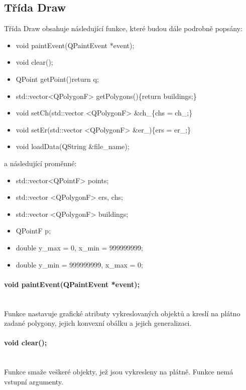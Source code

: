 \documentclass[11pt]{article}
\begin{document}
	 	
 	\subsection{Třída Draw}
 	Třída Draw obsahuje následující funkce, které budou dále podrobně popsány:
 	
 	\begin{itemize}
 		\item void paintEvent(QPaintEvent *event);
 		\item void clear();
 		\item QPoint getPoint(){return q;}
 		\item std::vector<QPolygonF> getPolygons()\{return buildings;\}
 		\item void setCh(std::vector <QPolygonF> \&ch\_\{chs = ch\_;\}
 		\item void setEr(std::vector <QPolygonF> \&er\_)\{ers = er\_;\}
 		\item void loadData(QString \&file\_name);
 	\end{itemize}
 	
 	a následující proměnné:
 	
 	\begin{itemize}
 		\item std::vector<QPointF> points;
 		\item std::vector <QPolygonF> ers, chs;
 		\item std::vector <QPolygonF> buildings;
 		\item QPointF p;
 		\item double y\_max = 0, x\_min = 999999999;
 		\item double y\_min = 999999999, x\_max = 0;
 	\end{itemize}
 	
 	\paragraph{void paintEvent(QPaintEvent *event);}\mbox{}\\
 	Funkce nastavuje grafické atributy vykreslovaných objektů a kreslí na plátno zadané polygony, jejich konvexní obálku a jejich generalizaci. 
 	
 	\paragraph{void clear();}\mbox{}\\
 	Funkce smaže veškeré objekty, jež jsou vykresleny na plátně. Funkce nemá vstupní argumenty. 
 	
\end{document}

